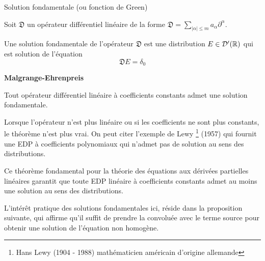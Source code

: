 \vspace{1em}

\begin{definitionbox}
\begin{definition} 
    Solution fondamentale (ou fonction de Green)

    \vspace{1em}
    
    Soit $\mathfrak{D}$ un opérateur différentiel linéaire de la forme $\mathfrak{D} = \sum_{|\alpha| \leq m}^{} a_{\alpha}\partial^{\alpha}$.

    Une solution fondamentale de l'opérateur $\mathfrak{D}$ est une distribution $E \in \mathcal{D}'(\mathbb{R})$
    qui est solution de l'équation 
    $$ \mathfrak{D} E = \delta_0 $$

\end{definition}
\end{definitionbox}

\begin{theorembox}
\begin{theorem}
    \textbf{Malgrange-Ehrenpreis}
    \vspace{1em}

    Tout opérateur différentiel linéaire à coefficients constants admet une solution fondamentale.


\end{theorem}
\end{theorembox}


\begin{remarkbox}
\begin{remark}
    Lorsque l'opérateur n'est plus linéaire ou si les coefficients ne sont plus constants, le théorème n'est
    plus vrai. On peut citer l'exemple de Lewy \footnote{Hans Lewy (1904 - 1988) mathématicien américain d'origine allemande} (1957) qui fournit une EDP à coefficients polynomiaux qui n'admet pas de solution au sens des distributions.
\end{remark}
\end{remarkbox}

Ce théorème fondamental pour la théorie des équations aux dérivées partielles linéaires garantit que toute EDP linéaire à coefficients
constants admet au moins une solution au sens des distributions.

L'intérêt pratique des solutions fondamentales ici, réside dans la proposition suivante, 
qui affirme qu'il suffit de prendre la convoluée avec le terme source pour obtenir une solution de l'équation non homogène.

